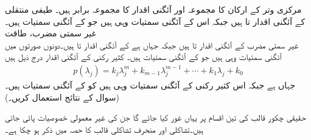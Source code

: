 مرکزی وتر کے ارکان کا مجموعہ اور آئگنی اقدار کا مجموعہ برابر ہیں۔
\quad طیفی منتقلی\\
 کے آئگنی اقدار  تا   ہیں جبکہ اس کے آئگنی سمتیات وہی ہیں جو  کے آئگنی سمتیات ہیں۔
\quad غیر سمتی مضرب، طاقت\\
غیر سمتی مضرب  کے آئگنی اقدار  تا  ہیں جبکہ  جہاں  ہے کے آئگنی اقدار  تا  ہیں۔دونوں صورتوں میں آئگنی سمتیات وہی ہیں جو  کے آئگنی سمتیات ہیں۔
کثیر رکنی  کے آئگنی اقدار درج ذیل ہیں
\begin{align*}
p(\lambda_j)=k_j\lambda_j^m+k_{m-1}\lambda_j^{m-1}+\cdots+k_1\lambda_j+k_0
\end{align*}
جہاں  ہے جبکہ اس کثیر رکنی کے آئگنی سمتیات وہی ہیں کو  کے آئگنی سمتیات ہیں۔(سوال  کے نتائج استعمال کریں۔)

حقیقی چکور قالب کی تین اقسام پر یہاں غور کیا جائے گا جن کی غیر معمولی خصوصیات پائی جاتی ہیں۔تشاکلی اور منحرف تشاکلی قالب کا حصہ  میں ذکر ہو چکا ہے۔

